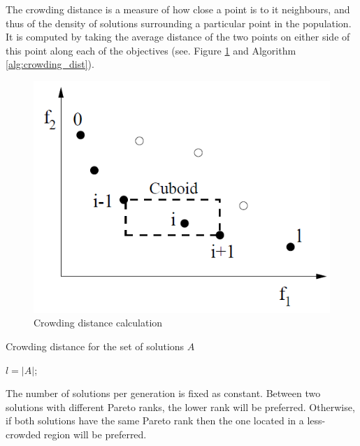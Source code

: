 \begin{definition}
The crowding distance is a measure of how close a point is to it neighbours, and thus of the density of solutions surrounding a particular point in the population. It is computed by taking the average distance of the two points on either side of this point along each of the objectives (see. Figure \ref{fig:crowding_dist} and Algorithm \ref{alg:crowding_dist}).
\end{definition}

\begin{figure}[h!]
\begin{center}
\includegraphics[width=0.6\linewidth]{crowdingdist}
\end{center}
\caption{Crowding distance calculation \cite{Deb00afast}}
\label{fig:crowding_dist}
\end{figure}

\begin{algorithm}[h!]
\caption{Crowding distance for the set of solutions $A$ \cite{Deb00afast}}
\label{alg:crowding_dist}
$l = |A|$;\\
 
\end{algorithm}

The number of solutions per generation is fixed as constant. Between two solutions with different Pareto ranks, the lower rank will be preferred. Otherwise, if both solutions have the same Pareto rank then the one located in a less-crowded region will be preferred.

